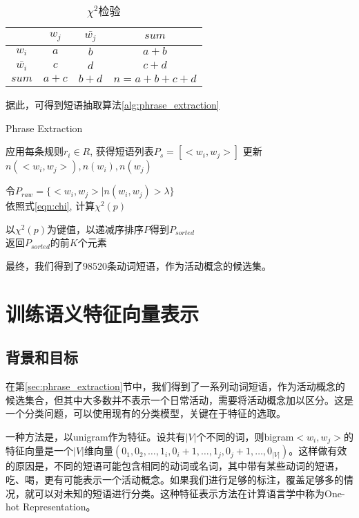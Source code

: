 \begin{table}
\centering
\begin{tabular}{|c|c|c|c|}
\hline
				& $w_j$ & $\bar{w_j}$	&	$sum$ \\
\hline
$w_i$ 			& $a$	& $b$ 			& $a+b$ \\
\hline
$\bar{w_i}$ 	& $c$	& $d$ 			& $c+d$ \\
\hline
$sum$ 			& $a+c$	& $b+d$ 		& $n=a+b+c+d$ \\
\hline
\end{tabular}
\caption{$\chi^2$检验}
\label{table:chi}
\end{table}

据此，可得到短语抽取算法\ref{alg:phrase_extraction}
\begin{algorithm}
\caption{Phrase Extraction}
\label{alg:phrase_extraction}

 {
    应用每条规则$r_i \in R$, 获得短语列表$P_{s}=[<w_i, w_j>]$\;
     {
    	更新$n(<w_i, w_j>), n(w_i), n(w_j)$\;
    }
}

令$P_{raw}=\{<w_i, w_j>|n(w_i, w_j)>\lambda \}$\\

 {
	依照式\ref{eqn:chi}, 计算$\chi^2(p)$
}

以$\chi^2(p)$为键值，以递减序排序$P$得到$P_{sorted}$\\

返回$P_{sorted}$的前$K$个元素
\end{algorithm}

最终，我们得到了98520条动词短语，作为活动概念的候选集。

\section{训练语义特征向量表示}
\label{sec:nnlm}
\subsection{背景和目标}
在第\ref{sec:phrase_extraction}节中，我们得到了一系列动词短语，作为活动概念的候选集合，但其中大多数并不表示一个日常活动，需要将活动概念加以区分。这是一个分类问题，可以使用现有的分类模型，关键在于特征的选取。

一种方法是，以unigram作为特征。设共有$|V|$个不同的词，则bigram$<w_i, w_j>$的特征向量是一个$|V|$维向量$(0_1, 0_2,\ldots, 1_i, 0_i+1,\ldots, 1_j, 0_j+1, \ldots, 0_{|V|})$。这样做有效的原因是，不同的短语可能包含相同的动词或名词，其中带有某些动词的短语，吃、喝，更有可能表示一个活动概念。如果我们进行足够的标注，覆盖足够多的情况，就可以对未知的短语进行分类。这种特征表示方法在计算语言学中称为One-hot Representation。

